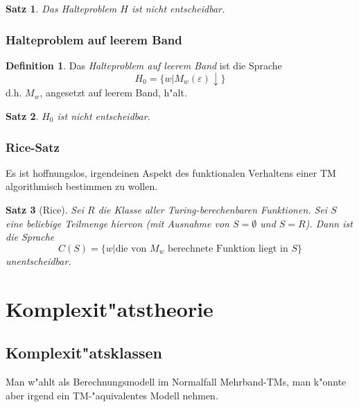 \documentclass[german, 10pt, a4paper, twocolumn]{scrartcl}
\newtheorem{satz}{Satz}[section]
\theoremstyle{definition}
\newtheorem*{definition}{Definition}
\theoremstyle{example}
\begin{document}
\begin{satz}
	Das Halteproblem $H$ ist nicht entscheidbar.
\end{satz}

\subsubsection{Halteproblem auf leerem Band}

\begin{definition}
	Das \textit{Halteproblem auf leerem Band} ist die Sprache
		\begin{displaymath}
			H_0 = \{w | M_w(\varepsilon)\downarrow\}
		\end{displaymath}
	d.h. $M_w$, angesetzt auf leerem Band, h"alt.
\end{definition}

\begin{satz}
	$H_0$ ist nicht entscheidbar.
\end{satz}

\subsubsection{Rice-Satz}

Es ist hoffnungslos, irgendeinen Aspekt des funktionalen Verhaltens einer TM algorithmisch bestimmen zu wollen.

\begin{satz}[Rice]
	Sei $R$ die Klasse aller Turing-berechenbaren Funktionen. Sei $S$ eine \textit{beliebige} Teilmenge hiervon (mit Ausnahme von $S=\emptyset$ und $S=R$). Dann ist die Sprache
		\begin{displaymath}
			C(S) = \{ w | \text{die von } M_w \text{ berechnete Funktion liegt in } S\}
		\end{displaymath}
	unentscheidbar.
\end{satz}

\section{Komplexit"atstheorie}

\subsection{Komplexit"atsklassen}

Man w"ahlt als Berechnungsmodell im Normalfall Mehrband-TMs, man k"onnte aber irgend ein TM-"aquivalentes Modell nehmen.\\
\end{document}
